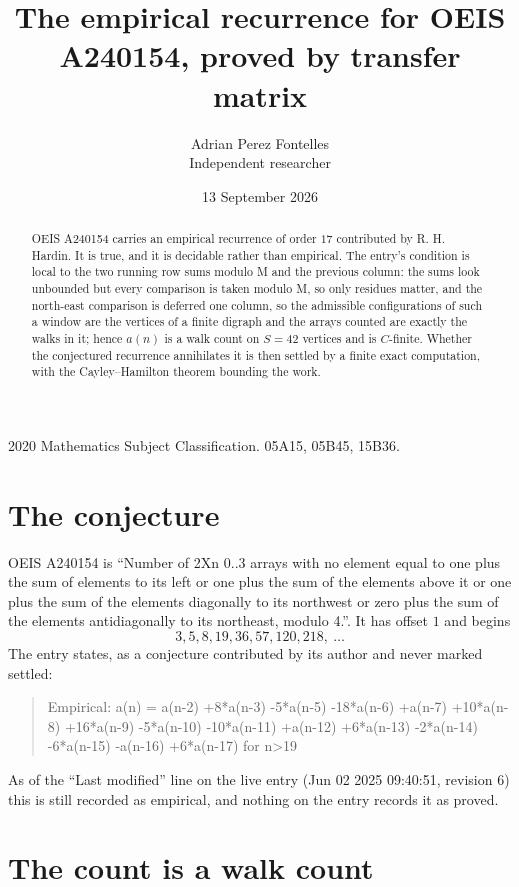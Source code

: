 \documentclass[11pt,a4paper]{article}
\title{The empirical recurrence for OEIS A240154, proved by transfer matrix}
\author{Adrian Perez Fontelles\\ \small Independent researcher}
\date{13 September 2026}
\theoremstyle{plain}
\theoremstyle{definition}
\begin{document}
\maketitle

\begin{abstract}
OEIS A240154 carries an empirical recurrence of order $17$ contributed by R. H. Hardin. It is
true, and it is decidable rather than empirical. The entry's condition is local to the two running row sums modulo M and the previous column: the sums look unbounded but every comparison is taken modulo M, so only residues matter, and the north-east comparison is deferred one column, so
the admissible configurations of such a window are the vertices of a finite digraph and the
arrays counted are exactly the walks in it; hence $a(n)$ is a walk count on $S=42$ vertices
and is $C$-finite. Whether the conjectured recurrence annihilates it is then settled by a
finite exact computation, with the Cayley--Hamilton theorem bounding the work.
\end{abstract}

\noindent\small 2020 Mathematics Subject Classification. 05A15, 05B45, 15B36.\normalsize

\section{The conjecture}

OEIS A240154 is ``Number of 2Xn 0..3 arrays with no element equal to one plus the sum of elements to its left or one plus the sum of the elements above it or one plus the sum of the elements diagonally to its northwest or zero plus the sum of the elements antidiagonally to its northeast, modulo 4.''. It has offset $1$ and begins
\[
3, 5, 8, 19, 36, 57, 120, 218,\ \dots
\]
The entry states, as a conjecture contributed by its author and never marked settled:
\begin{quote}
Empirical: a(n) = a(n-2) +8*a(n-3) -5*a(n-5) -18*a(n-6) +a(n-7) +10*a(n-8) +16*a(n-9) -5*a(n-10) -10*a(n-11) +a(n-12) +6*a(n-13) -2*a(n-14) -6*a(n-15) -a(n-16) +6*a(n-17) for n>19
\end{quote}
As of the ``Last modified'' line on the live entry (Jun 02 2025 09:40:51, revision 6) this is still
recorded as empirical, and nothing on the entry records it as proved.

\section{The count is a walk count}
\end{document}
